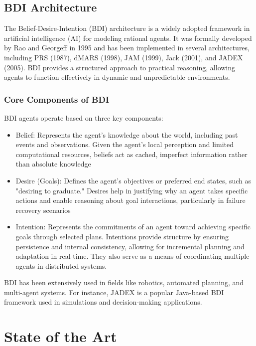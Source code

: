 \subsection{BDI Architecture}
\label{sub:bdi_architecture}

The Belief-Desire-Intention (BDI) architecture is a widely adopted framework in
artificial intelligence (AI) for modeling rational agents. It was formally developed
by Rao and Georgeff in 1995 \cite{bdi-icmas95} and has been implemented in several
architectures, including PRS (1987), dMARS (1998), JAM (1999), Jack (2001), and
JADEX (2005). BDI provides a structured approach to practical reasoning,
allowing agents to function effectively in dynamic and unpredictable
environments.

\subsubsection{Core Components of BDI}
BDI agents operate based on three key components:
\begin{itemize}
  \item Belief: Represents the agent’s knowledge about the world, including past
    events and observations. Given the agent's local perception and limited
    computational resources, beliefs act as cached, imperfect information rather
    than absolute knowledge

  \item Desire (Goals): Defines the agent’s objectives or preferred end states, such
    as "desiring to graduate." Desires help in justifying why an agent takes
    specific actions and enable reasoning about goal interactions, particularly in
    failure recovery scenarios

  \item Intention: Represents the commitments of an agent toward achieving
    specific goals through selected plans. Intentions provide structure by ensuring
    persistence and internal consistency, allowing for incremental planning and
    adaptation in real-time. They also serve as a means of coordinating multiple
    agents in distributed systems.
\end{itemize}

BDI has been extensively used in fields like robotics, automated planning, and
multi-agent systems. For instance, JADEX is a popular Java-based BDI framework
used in simulations and decision-making applications.

\section{State of the Art}
\label{sec:state_of_the_art}

